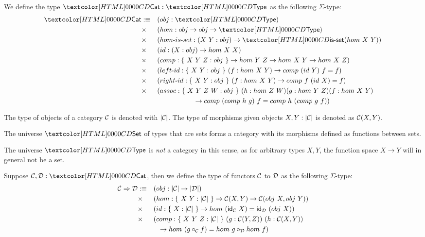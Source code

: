 \begin{definition}[Category]
  We define the type $\Cat : \Type$ as the following $\Sigma$-type:
  \begin{align*}
    \Cat &\ddefeq &&(obj : \Type) \\
         &\times &&(hom : obj \to obj \to \Type) \\
         &\times &&(\identalt{hom-is-set} : (X\ Y : obj) \to \isset (hom\ X\ Y)) \\
         &\times &&(id : (X : obj) \to hom\ X\ X) \\
         &\times &&(comp : \{\ X\ Y\ Z : obj\ \} \to hom\ Y\ Z \to hom\ X\ Y \to hom\ X\ Z) \\
         &\times &&(\identalt{left-id} : \{\ X\ Y : obj\ \}\ (f : hom\ X\ Y) \to comp\ (id\ Y)\ f = f) \\
         &\times &&(\identalt{right-id} : \{\ X\ Y : obj\ \}\ (f : hom\ X\ Y) \to comp\ f\ (id\ X) = f) \\
         &\times &&(assoc : \{\ X\ Y\ Z\ W : obj\ \}\ (h : hom\ Z\ W) (g : hom\ Y\ Z) (f : hom\ X\ Y) \\
         & &&\ \ \ \ \ \ \ \ \ \ \ \ \ \ \ \ \to comp\ (comp\ h\ g)\ f = comp\ h\ (comp\ g\ f))
  \end{align*}
\end{definition}

The type of objects of a category $\mathcal{C}$ is denoted with $| \mathcal{C} |$. The
type of morphisms given objects $X, Y : | \mathcal{C} |$ is denoted as
$\mathcal{C}(X,Y)$.

\begin{example}
  The universe $\Set$ of types that are sets forms a category with its
  morphisms defined as functions between sets.
\end{example}

\begin{remark}
  The universe $\Type$ is \emph{not} a category in this sense, as for
  arbitrary types $X, Y$, the function space $X \to Y$ will in general
  not be a set.
\end{remark}

\begin{definition}[Functor]
  Suppose $\Cc, \Dd : \Cat$, then we define the type of functors $\mathcal{C}$
  to $\mathcal{D}$ as the following $\Sigma$-type:
  \begin{align*}
    \Func{\Cc}{\Dd} &\ddefeq &&(obj : | \Cc | \to | \Dd |) \\
    &\times &&(hom : \{\ X\ Y : | \Cc |\ \} \to \Cc(X,Y) \to \Cc(obj\ X, obj\ Y)) \\
    &\times &&(id : \{\ X : | \Cc |\ \} \to hom\ (\id_{\Cc}\ X) = \id_{\Dd}\ (obj\ X)) \\
    &\times &&(comp : \{\ X\ Y\ Z : | \Cc |\ \}\ (g : \Cc(Y,Z))\ (h : \Cc(X,Y)) \\
    &&&\ \ \to hom\ (g \circ_{\Cc} f) = hom\ g \circ_{\Dd} hom\ f)
  \end{align*}
\end{definition}

